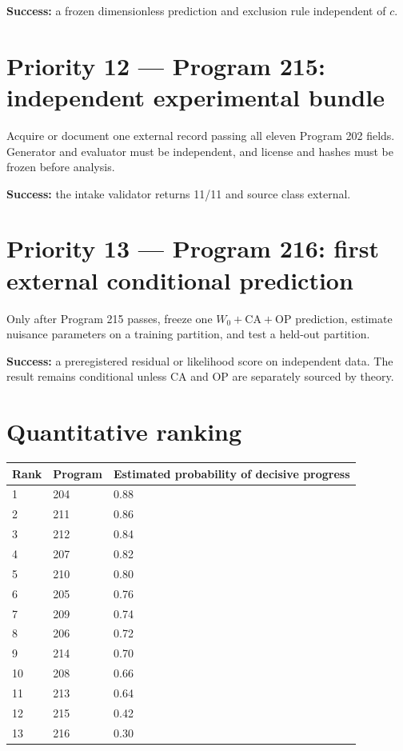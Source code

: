 \documentclass[11pt,a4paper,openany]{report}
\begin{document}
\textbf{Success:} a frozen dimensionless prediction and exclusion rule independent of \(c\).

\section{Priority 12 --- Program 215: independent experimental bundle}

Acquire or document one external record passing all eleven Program 202 fields. Generator and evaluator must be independent, and license and hashes must be frozen before analysis.

\textbf{Success:} the intake validator returns 11/\allowbreak{}11 and source class external.

\section{Priority 13 --- Program 216: first external conditional prediction}

Only after Program 215 passes, freeze one \(W_0+\mathrm{CA}+\mathrm{OP}\) prediction, estimate nuisance parameters on a training partition, and test a held-out partition.

\textbf{Success:} a preregistered residual or likelihood score on independent data. The result remains conditional unless CA and OP are separately sourced by theory.

\section{Quantitative ranking}

\begin{center}
\begingroup\small
\setlength{\tabcolsep}{3.5pt}
\renewcommand{\arraystretch}{1.16}
\begin{longtable}{@{}p{}p{}p{}@{}}
\toprule
\textbf{Rank} & \textbf{Program} & \textbf{Estimated probability of decisive progress} \\
\midrule
\endhead
1 & 204 & 0.88 \\
2 & 211 & 0.86 \\
3 & 212 & 0.84 \\
4 & 207 & 0.82 \\
5 & 210 & 0.80 \\
6 & 205 & 0.76 \\
7 & 209 & 0.74 \\
8 & 206 & 0.72 \\
9 & 214 & 0.70 \\
10 & 208 & 0.66 \\
11 & 213 & 0.64 \\
12 & 215 & 0.42 \\
13 & 216 & 0.30 \\
\bottomrule
\end{longtable}
\endgroup
\end{center}
\end{document}
